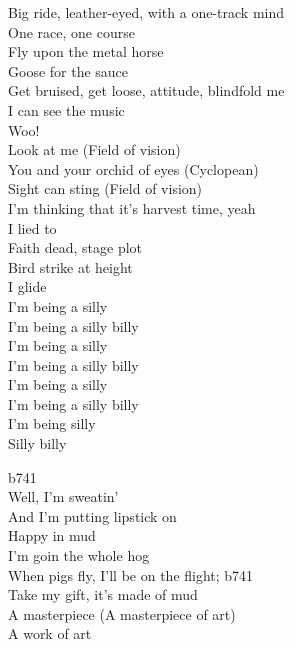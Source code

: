 Big ride, leather-eyed, with a one-track mind \\
One race, one course \\
Fly upon the metal horse \\
Goose for the sauce \\
Get bruised, get loose, attitude, blindfold me \\
I can see the music \\
Woo! \\

Look at me (Field of vision) \\
You and your orchid of eyes (Cyclopean) \\
Sight can sting (Field of vision) \\
I'm thinking that it's harvest time, yeah \\

I lied to  \\
Faith dead, stage plot \\
Bird strike at height \\
I glide \\

I'm being a silly \\
I'm being a silly billy \\
I'm being a silly \\
I'm being a silly billy \\
I'm being a silly \\
I'm being a silly billy \\
I'm being silly \\
Silly billy \\



b741 \\

Well, I'm sweatin' \\
And I'm putting lipstick on \\
Happy in mud \\
I'm goin the whole hog \\

When pigs fly, I'll be on the flight; b741 \\

Take my gift, it's made of mud \\
A masterpiece (A masterpiece of art) \\
A work of art \\

